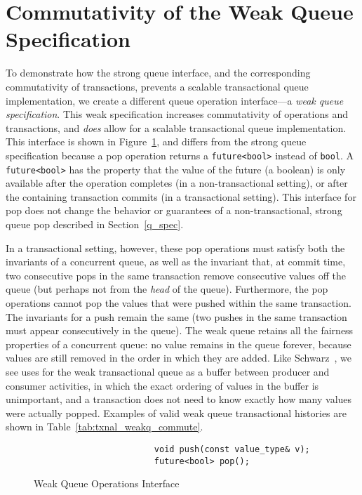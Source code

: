\section{Commutativity of the Weak Queue Specification}
\label{wqueue}

To demonstrate how the strong queue interface, and the corresponding commutativity of transactions, prevents a scalable transactional queue implementation, we create a different queue operation interface---a \emph{weak queue specification}. This weak specification increases commutativity of operations and transactions, and \emph{does} allow for a scalable transactional queue implementation. This interface is shown in Figure~\ref{fig:wq_interface}, and differs from the strong queue specification because a pop operation returns a \texttt{future<bool>} instead of \texttt{bool}. A \texttt{future<bool>} has the property that the value of the future (a boolean) is only available after the operation completes (in a non-transactional setting), or after the containing transaction commits (in a transactional setting). This interface for pop does not change the behavior or guarantees of a non-transactional, strong queue pop described in Section~\ref{q_spec}.
 
In a transactional setting, however, these pop operations must satisfy both the invariants of a concurrent queue, as well as the invariant that, at commit time, two consecutive pops in the same transaction remove consecutive values off the queue (but perhaps not from the \emph{head} of the queue). Furthermore, the pop operations cannot pop the values that were pushed within the same transaction. The invariants for a push remain the same (two pushes in the same transaction must appear consecutively in the queue). 
The weak queue retains all the fairness properties of a concurrent queue: no value remains in the queue forever, because values are still removed in the order in which they are added. Like Schwarz~\cite{schwarz}, we see uses for the weak transactional queue as a buffer between producer and consumer activities, in which the exact ordering of values in the buffer is unimportant, and a transaction does not need to know exactly how many values were actually popped. Examples of valid weak queue transactional histories are shown in Table~\ref{tab:txnal_weakq_commute}.  

\begin{figure}[t]
    \centering
    \begin{lstlisting}
                        void push(const value_type& v); 
                        future<bool> pop();                     
    \end{lstlisting}
    \caption{Weak Queue Operations Interface}
    \label{fig:wq_interface}
\end{figure}

